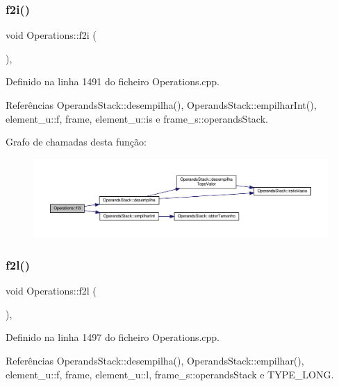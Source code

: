 \subsubsection{\texorpdfstring{f2i()}{f2i()}}
{\footnotesize\ttfamily void Operations\+::f2i (\begin{DoxyParamCaption}{ }\end{DoxyParamCaption})\hspace{0.3cm}{\ttfamily [static]}, {\ttfamily [private]}}



Definido na linha 1491 do ficheiro Operations.\+cpp.



Referências Operands\+Stack\+::desempilha(), Operands\+Stack\+::empilhar\+Int(), element\+\_\+u\+::f, frame, element\+\_\+u\+::is e frame\+\_\+s\+::operands\+Stack.

Grafo de chamadas desta função\+:\nopagebreak
\begin{figure}[H]
\begin{center}
\leavevmode
\includegraphics[width=350pt]{classOperations_adea8a32fb2ba183d0200ac22e1126fde_cgraph}
\end{center}
\end{figure}
\mbox{\label{classOperations_a175cdab8d092bdd6c27bace9efbcd27e}} 
\subsubsection{\texorpdfstring{f2l()}{f2l()}}
{\footnotesize\ttfamily void Operations\+::f2l (\begin{DoxyParamCaption}{ }\end{DoxyParamCaption})\hspace{0.3cm}{\ttfamily [static]}, {\ttfamily [private]}}



Definido na linha 1497 do ficheiro Operations.\+cpp.



Referências Operands\+Stack\+::desempilha(), Operands\+Stack\+::empilhar(), element\+\_\+u\+::f, frame, element\+\_\+u\+::l, frame\+\_\+s\+::operands\+Stack e T\+Y\+P\+E\+\_\+\+L\+O\+NG.

